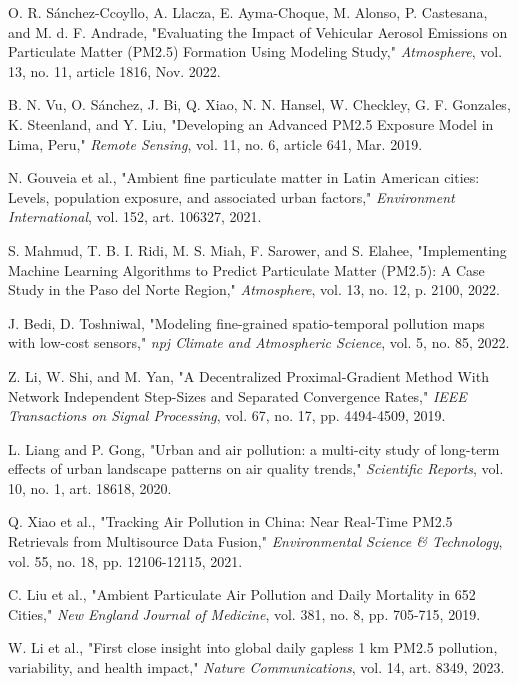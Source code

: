 \documentclass[conference]{IEEEtran}
\begin{document}
\begin{thebibliography}{00}
 O. R. Sánchez-Ccoyllo, A. Llacza, E. Ayma-Choque, M. Alonso, P. Castesana, and M. d. F. Andrade, "Evaluating the Impact of Vehicular Aerosol Emissions on Particulate Matter (PM2.5) Formation Using Modeling Study," \textit{Atmosphere}, vol. 13, no. 11, article 1816, Nov. 2022.

 B. N. Vu, O. Sánchez, J. Bi, Q. Xiao, N. N. Hansel, W. Checkley, G. F. Gonzales, K. Steenland, and Y. Liu, "Developing an Advanced PM2.5 Exposure Model in Lima, Peru," \textit{Remote Sensing}, vol. 11, no. 6, article 641, Mar. 2019.

 N. Gouveia et al., "Ambient fine particulate matter in Latin American cities: Levels, population exposure, and associated urban factors," \textit{Environment International}, vol. 152, art. 106327, 2021.

 S. Mahmud, T. B. I. Ridi, M. S. Miah, F. Sarower, and S. Elahee, "Implementing Machine Learning Algorithms to Predict Particulate Matter (PM2.5): A Case Study in the Paso del Norte Region," \textit{Atmosphere}, vol. 13, no. 12, p. 2100, 2022.

 J. Bedi, D. Toshniwal, "Modeling fine-grained spatio-temporal pollution maps with low-cost sensors," \textit{npj Climate and Atmospheric Science}, vol. 5, no. 85, 2022.

 Z. Li, W. Shi, and M. Yan, "A Decentralized Proximal-Gradient Method With Network Independent Step-Sizes and Separated Convergence Rates," \textit{IEEE Transactions on Signal Processing}, vol. 67, no. 17, pp. 4494-4509, 2019.

 L. Liang and P. Gong, "Urban and air pollution: a multi-city study of long-term effects of urban landscape patterns on air quality trends," \textit{Scientific Reports}, vol. 10, no. 1, art. 18618, 2020.

 Q. Xiao et al., "Tracking Air Pollution in China: Near Real-Time PM2.5 Retrievals from Multisource Data Fusion," \textit{Environmental Science \& Technology}, vol. 55, no. 18, pp. 12106-12115, 2021.

 C. Liu et al., "Ambient Particulate Air Pollution and Daily Mortality in 652 Cities," \textit{New England Journal of Medicine}, vol. 381, no. 8, pp. 705-715, 2019.

 W. Li et al., "First close insight into global daily gapless 1 km PM2.5 pollution, variability, and health impact," \textit{Nature Communications}, vol. 14, art. 8349, 2023.


\end{thebibliography}
\end{document}
